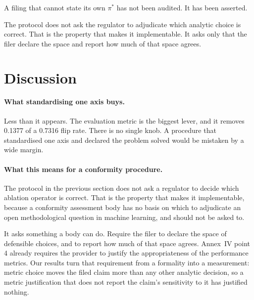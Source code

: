 \documentclass[letterpaper]{article} %
\begin{document}
\noindent
A filing that cannot state its own $\pi^{*}$ has not been audited. It has been
asserted.

The protocol does not ask the regulator to adjudicate which analytic choice is
correct. That is the property that makes it implementable. It asks only that the
filer declare the space and report how much of that space agrees.

%
\section{Discussion}

\paragraph{What standardising one axis buys.}
Less than it appears. The evaluation metric is the biggest lever, and it removes
0.1377 of a 0.7316 flip rate. There is no single knob. A procedure that
standardised one axis and declared the problem solved would be mistaken by a
wide margin.

\paragraph{What this means for a conformity procedure.}
The protocol in the previous section does not ask a regulator to decide which
ablation operator is correct. That is the property that makes it implementable,
because a conformity assessment body has no basis on which to adjudicate an open
methodological question in machine learning, and should not be asked to.

It asks something a body can do. Require the filer to declare the space of
defensible choices, and to report how much of that space agrees. Annex~IV point
4 already requires the provider to justify the appropriateness of the
performance metrics. Our results turn that requirement from a formality into a
measurement: metric choice moves the filed claim more than any other analytic
decision, so a metric justification that does not report the claim's sensitivity
to it has justified nothing.
\end{document}
